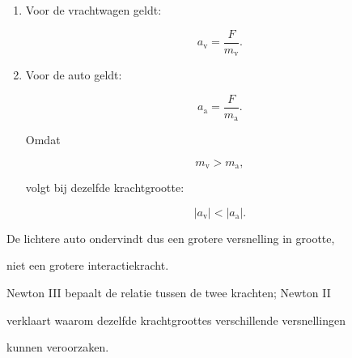 \documentclass{ximera}
\begin{document}
\begin{oefening}{\oefU\ESS}
\begin{oplossing}
\begin{enumerate}
  \item Voor de vrachtwagen geldt:

  \[a_{\mathrm v}=\frac{F}{m_{\mathrm v}}.\]

  \item Voor de auto geldt:

  \[a_{\mathrm a}=\frac{F}{m_{\mathrm a}}.\]

  Omdat

  \[m_{\mathrm v}>m_{\mathrm a},\]

  volgt bij dezelfde krachtgrootte:

  \[|a_{\mathrm v}|<|a_{\mathrm a}|.\]

\end{enumerate}

De lichtere auto ondervindt dus een grotere versnelling in grootte,

niet een grotere interactiekracht.

Newton III bepaalt de relatie tussen de twee krachten; Newton II

verklaart waarom dezelfde krachtgroottes verschillende versnellingen

kunnen veroorzaken.

\end{oplossing}

\end{oefening}
\end{document}
